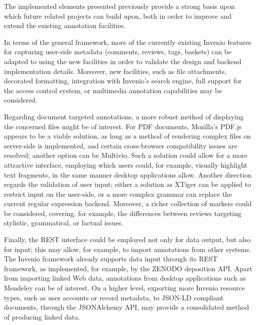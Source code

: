 
The implemented elements presented previously provide a strong basis upon which
future related projects can build upon, both in order to improve and extend the
existing annotation facilities.

In terms of the general framework, more of the currently existing Invenio
features for capturing user-side metadata (comments, reviews, tags, baskets)
can be adapted to using the new facilities in order to validate the design and
backend implementation details. Moreover, new facilities, such as file
attachments, decorated formatting, integration with Invenio's search engine,
full support for the access control system, or multimedia annotation
capabilities may be considered.

Regarding document targeted annotations, a more robust method of displaying the
concerned files might be of interest. For PDF documents, Mozilla's PDF.js
appears to be a viable solution, as long as a method of rendering complex files
on server-side is implemented, and certain cross-browser compatibility issues
are resolved; another option can be Multivio. Such a solution could allow for a
more attractive interface, employing which users could, for example, visually
highlight text fragments, in the same manner desktop applications allow.
Another direction regards the validation of user input; either a solution as
XTiger can be applied to restrict input on the user-side, or a more complex
grammar can replace the current regular expression backend. Moreover, a richer
collection of markers could be considered, covering, for example, the
differences between reviews targeting stylistic, grammatical, or factual
issues.

Finally, the REST  interface could be employed not only for data output, but
also for input; this may allow, for example, to import annotations from other
systems. The Invenio framework already supports data input through its REST
framework, as implemented, for example, by the ZENODO deposition API. Apart
from importing linked Web data, annotations from desktop applications such as
Mendeley can be of interest. On a higher level, exporting more Invenio resource
types, such as user accounts or record metadata, to JSON-LD compliant documents,
through the JSONAlchemy API, may provide a consolidated method of producing
linked data.
